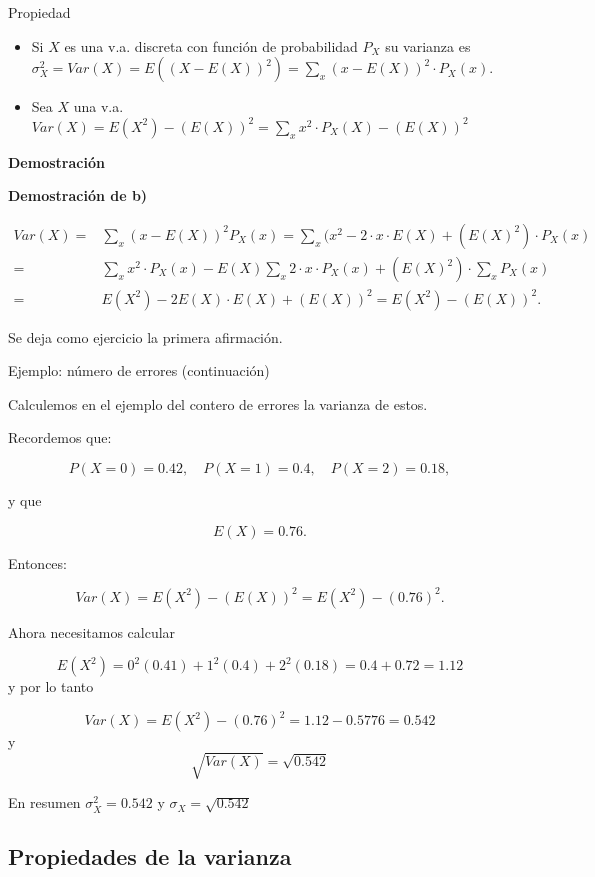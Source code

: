 \documentclass[
  letterpaper,
  DIV=11,
  numbers=noendperiod]{scrreprt}
\providecommand{\tightlist}{%
  \setlength{\itemsep}{0pt}\setlength{\parskip}{0pt}}\usepackage{longtable,booktabs,array}
\begin{document}
\begin{Proposicion}{Propiedad}{}

\begin{itemize}
\tightlist
\item
  Si \(X\) es una v.a. discreta con función de probabilidad \(P_X\) su
  varianza es
  \(\sigma_{X}^2=Var(X)=E((X-E(X))^2)=\sum_{x}(x-E(X))^2\cdot  P_{X}(x).\)
\item
  Sea \(X\) una v.a.
  \(Var(X)=E(X^2)-(E(X))^2=\sum_{x} x^2\cdot  P_{X}(X)-(E(X))^2\)
\end{itemize}

\end{Proposicion}

\textbf{Demostración}

\textbf{Demostración de b)}

\begin{align*}
Var(X)= & \sum_{x}(x-E(X))^2 P_{X}(x) = \sum_{x}(x^2 -2\cdot x\cdot E(X)+(E(X)^2)\cdot P_{X}(x)\\
= &  \sum_{x}x^2\cdot P_{X}(x) -  E(X)\sum_{x}2\cdot x \cdot P_{X}(x) + (E(X)^2)\cdot\sum_{x} P_{X}(x)\\
= &  E(X^2)- 2 E(X)\cdot E(X) + (E(X))^2=E(X^2)-(E(X))^2.
\end{align*}

Se deja como ejercicio la primera afirmación.

\begin{Ejemplo}{Ejemplo: número de errores (continuación)}{}

Calculemos en el ejemplo del contero de errores la varianza de estos.

Recordemos que:

\[
P(X=0)=0.42,\quad P(X=1)=0.4, \quad P(X=2)=0.18,
\]

y que

\[
E(X)=0.76.
\]

Entonces:

\[
Var(X)=E(X^2)-(E(X))^2 = E(X^2)-(0.76)^2.
\]

Ahora necesitamos calcular

\[E(X^2)= 0^2 (0.41)+ 1^2 (0.4)+ 2^2 (0.18)=0.4+0.72=1.12\] y por lo
tanto

\[Var(X)= E(X^2)-(0.76)^2=1.12-0.5776=0.542\] y
\[\sqrt{Var(X)}=\sqrt{0.542}\]

En resumen \(\sigma_{X}^2=0.542\) y \(\sigma_{X}=\sqrt{0.542}\)

\end{Ejemplo}

\subsection{Propiedades de la
varianza}\label{propiedades-de-la-varianza}
\end{document}
